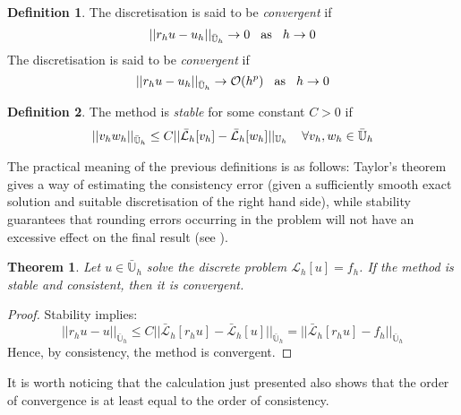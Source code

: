 \documentclass[11pt]{article}
\theoremstyle{theorem}
\newtheorem{theorem}{Theorem}
\theoremstyle{definition}
\newtheorem{definition}{Definition}
\begin{document}
\begin{definition}
	The discretisation is said to be \emph{convergent} if 
	\begin{equation}
	\label{eqn:convergent}
	||r_h u-u_h||_{{\bar{\mathbb{U}}}_h}\rightarrow 0\hspace{3mm}\text{as}\hspace{3mm}h\rightarrow 0
	\end{equation}
	The discretisation is said to be \emph{convergent} if 
	\begin{equation}
	\label{eqn:convergent-p}
	||r_h u-u_h||_{{\bar{\mathbb{U}}}_h}\rightarrow \mathcal{O}(h^p)\hspace{3mm}\text{as}\hspace{3mm}h\rightarrow 0
	\end{equation}
\end{definition}

\begin{definition}
	The method is \emph{stable} for some constant $C>0$ if
	\begin{equation}
	\label{eqn:stable}
	||v_h w_h||_{{\bar{\mathbb{U}}}_h}\le C||\bar{\mathcal{L}}_h[v_h]-\bar{\mathcal{L}}_h[w_h]||_{{{\mathbb{U}}}_h}\hspace{4mm} \forall v_h,w_h\in\bar{\mathbb{U}}_h
	\end{equation}
\end{definition}

The practical meaning of the previous definitions is as follows: Taylor’s theorem gives a way of estimating the consistency error (given a sufficiently smooth exact solution and suitable discretisation of the right hand side), while stability guarantees that rounding errors occurring in the problem will not have an excessive effect on the final result (see \cite{lec-notes}).

\begin{theorem}
	\label{thm:stab-conv}
	Let $u\in\bar{\mathbb{U}}_h$ solve the discrete problem $\mathcal{L}_h[u]=f_h$. If the method is stable and consistent, then it is convergent. 
\end{theorem}
\begin{proof}
	Stability implies:
	$$||r_hu-u||_{{\bar{\mathbb{U}}}_h}\le C ||\bar{\mathcal{L}}_h[r_hu]-\bar{\mathcal{L}}_h[u]||_{{\bar{\mathbb{U}}}_h}=||\bar{\mathcal{L}}_h[r_hu]-f_h||_{{\bar{\mathbb{U}}}_h}$$
	Hence, by consistency, the method is convergent.
\end{proof}

It is worth noticing that the calculation just presented also shows that the order of convergence is at least equal to the order of consistency.\\
\end{document}
